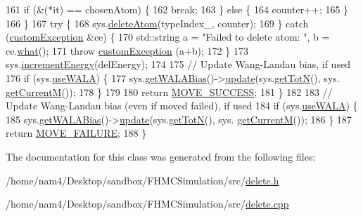 \begin{DoxyCode}
161             \textcolor{keywordflow}{if} (&(*it) == chosenAtom) \{
162                 \textcolor{keywordflow}{break};
163             \} \textcolor{keywordflow}{else} \{
164                 counter++;
165             \}
166         \}
167         \textcolor{keywordflow}{try} \{
168             sys.\hyperlink{classsim_system_acabf4fc5b5b90bba62e1449ddb3646c6}{deleteAtom}(typeIndex\_, counter);
169         \} \textcolor{keywordflow}{catch} (\hyperlink{classcustom_exception}{customException} &ce) \{
170             std::string a = \textcolor{stringliteral}{"Failed to delete atom: "}, b = ce.\hyperlink{classcustom_exception_aeb6ab5848b038adfc68fde86a512f691}{what}();
171             \textcolor{keywordflow}{throw} \hyperlink{classcustom_exception}{customException} (a+b);
172         \}
173         sys.\hyperlink{classsim_system_a6ad31c08955b80873f865b3069618dcb}{incrementEnergy}(delEnergy);
174 
175         \textcolor{comment}{// Update Wang-Landau bias, if used}
176         \textcolor{keywordflow}{if} (sys.\hyperlink{classsim_system_aa83b00006b3919fb6e13f1bdeadece6a}{useWALA}) \{
177             sys.\hyperlink{classsim_system_a7cb5049de8b0988349e89e30e4000407}{getWALABias}()->\hyperlink{classwala_ab439e3f60bea6c54522a870b9ad67acf}{update}(sys.\hyperlink{classsim_system_a37dd827f4057049763351510147b9f1d}{getTotN}(), sys.
      \hyperlink{classsim_system_a299fe4372e610b554eaaf5f5957b2dbc}{getCurrentM}());
178         \}
179 
180         \textcolor{keywordflow}{return} \hyperlink{moves_8h_ae8285cbddc5d21f73f49dcbad82a775a}{MOVE\_SUCCESS};
181     \}
182 
183     \textcolor{comment}{// Update Wang-Landau bias (even if moved failed), if used}
184     \textcolor{keywordflow}{if} (sys.\hyperlink{classsim_system_aa83b00006b3919fb6e13f1bdeadece6a}{useWALA}) \{
185         sys.\hyperlink{classsim_system_a7cb5049de8b0988349e89e30e4000407}{getWALABias}()->\hyperlink{classwala_ab439e3f60bea6c54522a870b9ad67acf}{update}(sys.\hyperlink{classsim_system_a37dd827f4057049763351510147b9f1d}{getTotN}(), sys.
      \hyperlink{classsim_system_a299fe4372e610b554eaaf5f5957b2dbc}{getCurrentM}());
186     \}
187     \textcolor{keywordflow}{return} \hyperlink{moves_8h_a9832cf5fcfa8c0894545b591c9908e39}{MOVE\_FAILURE};
188 \}
\end{DoxyCode}


The documentation for this class was generated from the following files\-:\begin{DoxyCompactItemize}
\item 
/home/nam4/\-Desktop/sandbox/\-F\-H\-M\-C\-Simulation/src/\hyperlink{delete_8h}{delete.\-h}\item 
/home/nam4/\-Desktop/sandbox/\-F\-H\-M\-C\-Simulation/src/\hyperlink{delete_8cpp}{delete.\-cpp}\end{DoxyCompactItemize}

